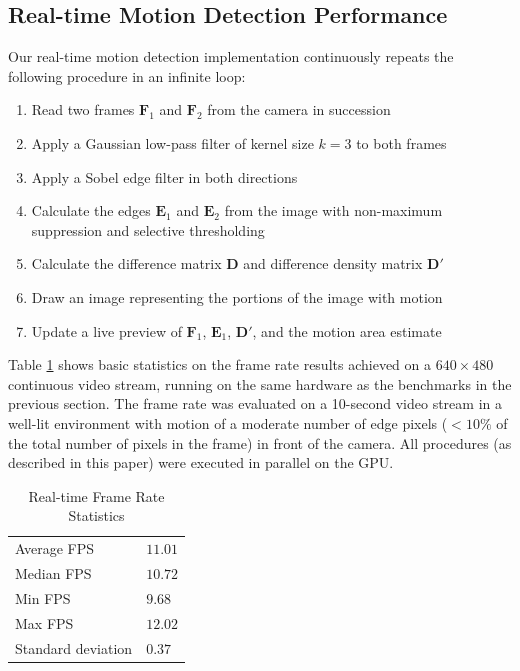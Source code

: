\documentclass[journal]{IEEEtran}
\begin{document}
\subsection{Real-time Motion Detection Performance}
Our real-time motion detection implementation continuously repeats the following procedure in an infinite loop:
\begin{enumerate}
	\item Read two frames $\boldsymbol{F}_1$ and $\boldsymbol{F}_2$ from the camera in succession
	\item Apply a Gaussian low-pass filter of kernel size $k = 3$ to both frames
	\item Apply a Sobel edge filter in both directions
	\item Calculate the edges $\boldsymbol{E}_1$ and $\boldsymbol{E}_2$ from the image with non-maximum suppression and selective thresholding
	\item Calculate the difference matrix $\boldsymbol{D}$ and difference density matrix $\boldsymbol{D}'$
	\item Draw an image representing the portions of the image with motion
	\item Update a live preview of $\boldsymbol{F}_1$, $\boldsymbol{E}_1$, $\boldsymbol{D}'$, and the motion area estimate
\end{enumerate}
Table \ref{real-time-fps-statistics} shows basic statistics on the frame rate results achieved on a $640 \times 480$ continuous video stream, running on the same hardware as the benchmarks in the previous section. The frame rate was evaluated on a 10-second video stream in a well-lit environment with motion of a moderate number of edge pixels ($< 10\%$ of the total number of pixels in the frame) in front of the camera. All procedures (as described in this paper) were executed in parallel on the GPU.
\begin{table}[H]
	\small
	\centering
	\caption{Real-time Frame Rate Statistics}
	\label{real-time-fps-statistics}
	\begin{tabular}{ll}
	 Average FPS & $11.01$ \\
	 Median FPS & $10.72$ \\
	 Min FPS & $9.68$ \\
	 Max FPS & $12.02$ \\
	 Standard deviation & $0.37$ \\
	\end{tabular}
\end{table}
\end{document}

